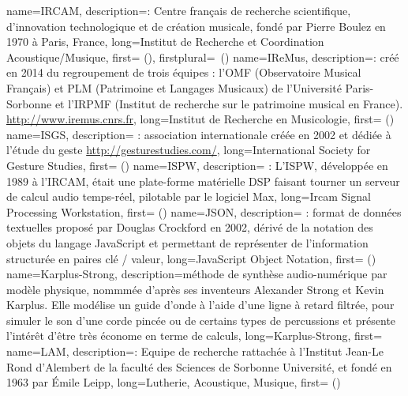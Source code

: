 {
    name={IRCAM},
    description={\textit{}: Centre français de recherche scientifique, d'innovation technologique et de création musicale, fondé par Pierre Boulez en 1970 à Paris, France},
    long={Institut de Recherche et Coordination Acoustique/Musique},
    first={ ()},
    firstplural={\glspluralsuffix\ (\glspluralsuffix)}
}
{
    name={IReMus},
    description={\textit{}: créé en 2014 du regroupement de trois équipes : l'OMF (Observatoire Musical Français) et PLM (Patrimoine et Langages Musicaux) de l’Université Paris-Sorbonne et l’IRPMF (Institut de recherche sur le patrimoine musical en France). \url{http://www.iremus.cnrs.fr}},
    long={Institut de Recherche en Musicologie},
    first={ ()}
}
{
    name={ISGS},
    description={\textit{} : association internationale créée en 2002 et dédiée à l'étude du geste \url{http://gesturestudies.com/}},
    long={International Society for Gesture Studies},
    first={ ()}
}
{
    name={ISPW},
    description={\textit{} : L'ISPW, développée en 1989 à l'\gls{IRCAM}, était une plate-forme matérielle \gls{DSP} faisant tourner un serveur de calcul audio temps-réel, pilotable par le logiciel Max},
    long={Ircam Signal Processing Workstation},
    first={ ()}
}
{
    name={JSON},
    description={\textit{} : format de données textuelles proposé par Douglas Crockford en 2002, dérivé de la notation des objets du langage JavaScript et permettant de représenter de l’information structurée en paires clé / valeur},
    long={JavaScript Object Notation},
    first={ ()}
}
{
    name={Karplus-Strong},
    description={méthode de synthèse audio-numérique par modèle physique, nommmée d'après ses inventeurs Alexander Strong et Kevin Karplus. Elle modélise un guide d'onde à l'aide d'une ligne à retard filtrée, pour simuler le son d'une corde pincée ou de certains types de percussions et présente l'intérêt d'être très économe en terme de calculs},
    long={Karplus-Strong},
    first={}
}
{
    name={LAM},
    description={\textit{}: Equipe de recherche rattachée à l'Institut Jean-Le Rond d'Alembert de la faculté des Sciences de Sorbonne Université, et fondé en 1963 par Émile Leipp},
    long={Lutherie, Acoustique, Musique},
    first={ ()}
}
